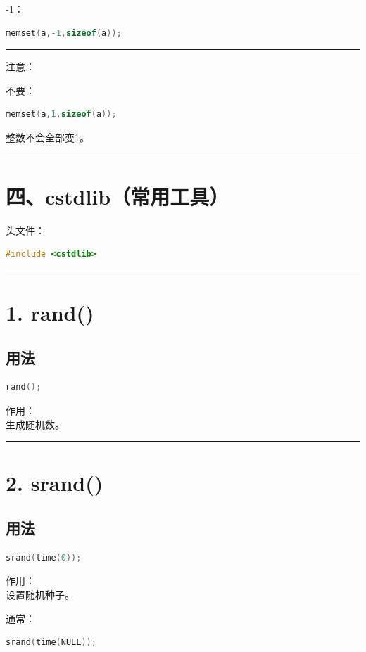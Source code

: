 \documentclass[9pt,twocolumn]{extarticle}
\begin{document}
-1：
\begin{lstlisting}[language=C++]
memset(a,-1,sizeof(a));
\end{lstlisting}

\noindent\rule{\linewidth}{0.4pt}

注意：

不要：
\begin{lstlisting}[language=C++]
memset(a,1,sizeof(a));
\end{lstlisting}
整数不会全部变1。

\noindent\rule{\linewidth}{0.4pt}

\section{四、cstdlib（常用工具）}

头文件：
\begin{lstlisting}[language=C++]
#include <cstdlib>
\end{lstlisting}

\noindent\rule{\linewidth}{0.4pt}

\section{1. rand()}

\subsection{用法}
\begin{lstlisting}[language=C++]
rand();
\end{lstlisting}
作用：\\
生成随机数。

\noindent\rule{\linewidth}{0.4pt}

\section{2. srand()}

\subsection{用法}
\begin{lstlisting}[language=C++]
srand(time(0));
\end{lstlisting}
作用：\\
设置随机种子。

通常：
\begin{lstlisting}[language=C++]
srand(time(NULL));
\end{lstlisting}
\end{document}
